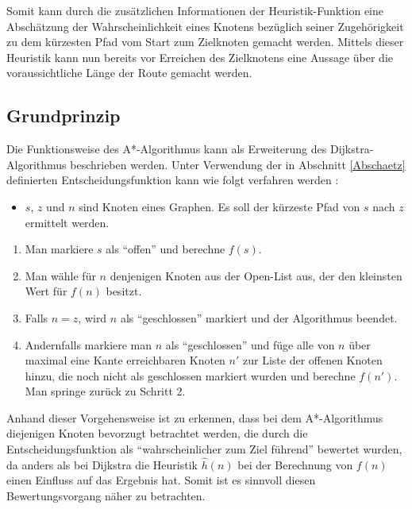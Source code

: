 	
	Somit kann durch die zusätzlichen Informationen der Heuristik-Funktion eine Abschätzung der Wahrscheinlichkeit eines Knotens bezüglich seiner Zugehörigkeit zu dem  kürzesten Pfad vom Start zum Zielknoten gemacht werden. Mittels dieser Heuristik kann nun bereits vor Erreichen des Zielknotens eine Aussage über die voraussichtliche Länge der Route gemacht werden.
	
	\subsection{Grundprinzip}
		\label{A*-Alg}
		Die Funktionsweise des A*-Algorithmus kann als Erweiterung des Dijkstra-Algorithmus beschrieben werden. Unter Verwendung der in Abschnitt \ref{Abschaetz} definierten Entscheidungsfunktion kann wie folgt verfahren werden \cite{Hart1968}:
		
		\begin{itemize}
			 \item 	$s$, $z$ und $n$ sind Knoten eines Graphen. Es soll der kürzeste Pfad von $s$ nach $z$ ermittelt werden. 
			
		\end{itemize}
		
		\begin{center}
			
			\begin{minipage}{0.8\linewidth}
				
				
				\begin{enumerate}
					\item Man markiere $s$ als "`offen"' und berechne $f(s)$.
					\item Man wähle für $n$ denjenigen Knoten aus der Open-List aus, der den  kleinsten Wert für $f(n)$ besitzt.
					\item Falls $n=z$, wird $n$ als "`geschlossen"' markiert und der Algorithmus beendet.
					\item Andernfalls markiere man $n$ als "`geschlossen"' und füge alle von $n$ über maximal eine Kante erreichbaren Knoten $n'$ zur Liste der offenen Knoten hinzu, die noch nicht als geschlossen markiert wurden und berechne $f(n')$. 	Man springe zurück zu Schritt 2.
				\end{enumerate}
			\end{minipage}
		\end{center}
		
		Anhand dieser Vorgehensweise ist zu erkennen, dass bei dem A*-Algorithmus diejenigen Knoten bevorzugt betrachtet werden, die durch die Entscheidungsfunktion als "`wahrscheinlicher zum Ziel führend"' bewertet wurden, da anders als bei Dijkstra die Heuristik $\hat{h}(n)$ bei der Berechnung von $f(n)$ einen Einfluss auf das Ergebnis hat. Somit ist es sinnvoll diesen Bewertungsvorgang näher zu betrachten. 
		

